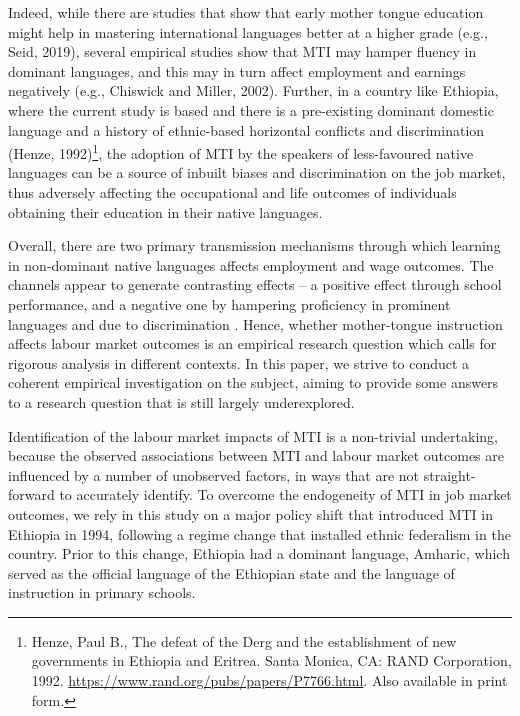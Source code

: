 Indeed, while there are studies that show that early mother tongue education might help in mastering international languages better at a higher grade (e.g., Seid, 2019), several empirical studies show that MTI may hamper fluency in dominant languages, and this may in turn affect employment and earnings negatively (e.g., Chiswick and Miller, 2002). Further, in a country like Ethiopia, where the current study is based and there is a pre-existing dominant domestic language and a history of ethnic-based horizontal conflicts and discrimination (Henze, 1992)\footnote{Henze, Paul B., The defeat of the Derg and the establishment of new governments in Ethiopia and Eritrea. Santa Monica, CA: RAND Corporation, 1992. \url{https://www.rand.org/pubs/papers/P7766.html}. Also available in print form.},  the adoption of MTI by the speakers of less-favoured native languages can be a source of inbuilt biases and discrimination on the job market, thus adversely affecting the occupational and life outcomes of individuals obtaining their education in their native languages. 

Overall, there are two primary transmission mechanisms through which learning in non-dominant native languages affects employment and wage outcomes. The channels appear to generate contrasting effects – a positive effect through school performance, and a negative one by hampering proficiency in prominent languages and due to discrimination . Hence, whether mother-tongue instruction affects labour market outcomes is an empirical research question which calls for rigorous analysis in different contexts. In this paper, we strive to conduct a coherent empirical investigation on the subject, aiming to provide some answers to a research question that is still largely underexplored. 

Identification of the labour market impacts of MTI is a non-trivial undertaking, because the observed associations between MTI and labour market outcomes are influenced by a number of unobserved factors, in ways that are not straight-forward to accurately identify. To overcome the endogeneity of MTI in job market outcomes, we rely in this study on a major policy shift that introduced MTI in Ethiopia in 1994, following a regime change that installed ethnic federalism in the country. Prior to this change, Ethiopia had a dominant language, Amharic, which served as the official language of the Ethiopian state and the language of instruction in primary schools. 

